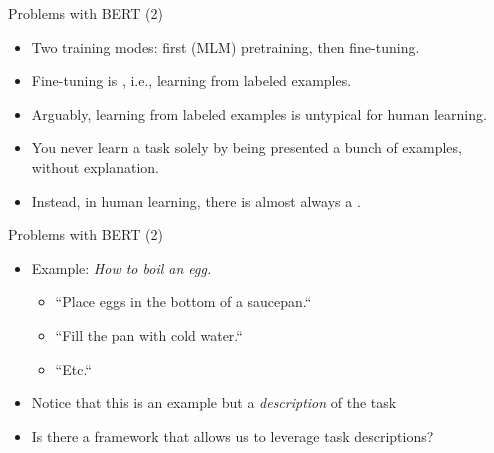 \documentclass[11pt,compress,t,notes=noshow, xcolor=table]{beamer}
\begin{document}

\begin{frame}{Problems with BERT (2)}

\vfill
			
\begin{itemize}
\item Two training modes: first (MLM) pretraining, then fine-tuning.
\item Fine-tuning is , i.e., learning from labeled examples.
\item Arguably, learning from labeled examples is untypical for human learning.
\item You never learn a task solely by being presented a bunch of examples, without explanation.
\item Instead, in human learning, there is almost always a .
    \end{itemize}

\vfill

\end{frame}


\begin{frame}{Problems with BERT (2)}

\vfill
			
\begin{itemize}
\item Example: \textit{How to boil an egg.}
		\begin{itemize}
			\item ``Place eggs in the bottom of a saucepan.``
			\item ``Fill the pan with cold water.``
			\item ``Etc.``
		\end{itemize}
\item Notice that this is  an example but a \textit{description} of the task
\item \ques Is there a framework that allows us to leverage task descriptions?
\end{itemize}

\vfill

\end{frame}

\end{document}
